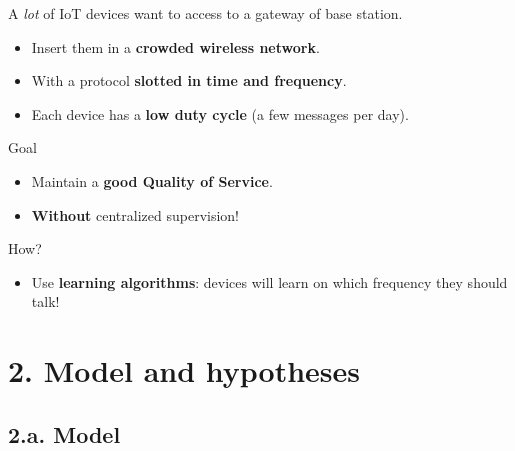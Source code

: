 \begin{frameO}[We want]

    A \emph{lot} of IoT devices want to access to a gateway of base station.

    \begin{itemize}\tightlist
        \item
              Insert them in a \textbf{crowded wireless network}.
        \item
              With a protocol \textbf{slotted in time and frequency}.
        \item
              Each device has a \textbf{low duty cycle} (a few messages per day).
    \end{itemize}


    \begin{colorblock}{Goal}

        \begin{itemize}\tightlist
            \item
                  Maintain a \textbf{good Quality of Service}.
            \item
                  \textbf{Without} centralized supervision!
        \end{itemize}

    \end{colorblock}


    \begin{alertblock}{How?}

        \begin{itemize}\tightlist
            \item
                  Use \textbf{learning algorithms}: devices will learn on which
                  frequency they should talk!
        \end{itemize}

    \end{alertblock}

\end{frameO}



\section{\hfill{}2. Model and hypotheses\hfill{}}

\subsection{\hfill{}2.a. Model\hfill{}}

